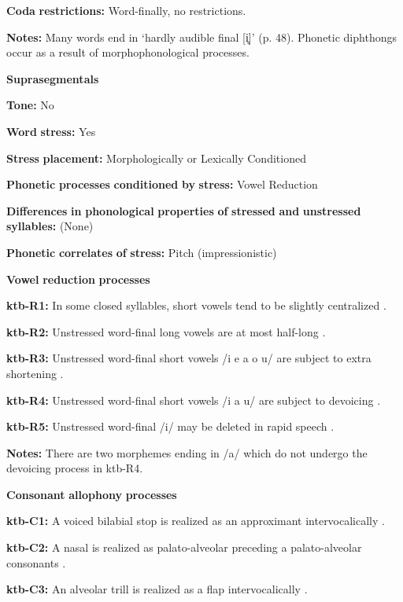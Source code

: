 \begin{styleBody}
\textbf{Coda} \textbf{restrictions:} Word-finally, no restrictions.

\textbf{Notes:} Many words end in ‘hardly audible final [i̥]’ (p. 48). Phonetic diphthongs occur as a result of morphophonological processes.

\textbf{Suprasegmentals}

\textbf{Tone:} No

\textbf{Word} \textbf{stress:} Yes

\textbf{Stress} \textbf{placement:} Morphologically or Lexically Conditioned

\textbf{Phonetic} \textbf{processes} \textbf{conditioned} \textbf{by} \textbf{stress:} Vowel Reduction

\textbf{Differences} \textbf{in} \textbf{phonological} \textbf{properties} \textbf{of} \textbf{stressed} \textbf{and} \textbf{unstressed} \textbf{syllables:} (None)

\textbf{Phonetic} \textbf{correlates} \textbf{of} \textbf{stress:} Pitch (impressionistic)

\textbf{Vowel} \textbf{reduction} \textbf{processes}

\textbf{ktb-R1:} In some closed syllables, short vowels tend to be slightly centralized \citep[18]{Treis2008}.

\textbf{ktb-R2:} Unstressed word-final long vowels are at most half-long \citep[19]{Treis2008}.

\textbf{ktb-R3:} Unstressed word-final short vowels /i e a o u/ are subject to extra shortening \citep[20]{Treis2008}.

\textbf{ktb-R4:} Unstressed word-final short vowels /i a u/ are subject to devoicing \citep[20]{Treis2008}.

\textbf{ktb-R5:} Unstressed word-final /i/ may be deleted in rapid speech \citep[20]{Treis2008}.

\textbf{Notes:} There are two morphemes ending in /a/ which do not undergo the devoicing process in ktb-R4.

\textbf{Consonant} \textbf{allophony} \textbf{processes}

\textbf{ktb-C1:} A voiced bilabial stop is realized as an approximant intervocalically \citep[24]{Treis2008}.

\textbf{ktb-C2:} A nasal is realized as palato-alveolar preceding a palato-alveolar consonants \citep[34]{Treis2008}.

\textbf{ktb-C3:} An alveolar trill is realized as a flap intervocalically \citep[35]{Treis2008}.


\end{styleBody}
